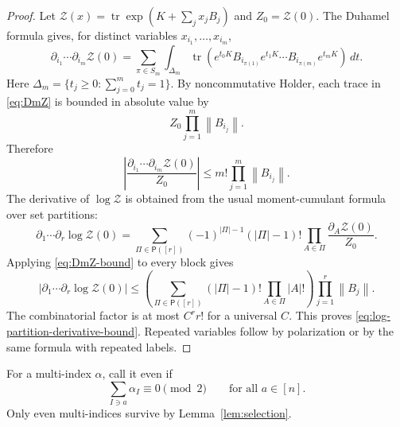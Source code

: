 \documentclass[11pt]{article}
\newcommand{\tr}{\operatorname{tr}}
\newcommand{\dd}{\,d}
\newcommand{\norm}[1]{\left\lVert #1\right\rVert}
\begin{document}
\begin{proof}
  Let $\mathcal Z(x)=\tr\exp(K+\sum_jx_jB_j)$ and $Z_0=\mathcal Z(0)$.  The
  Duhamel formula gives, for distinct variables $x_{i_1},\ldots,x_{i_m}$,
  \begin{equation}\label{eq:DmZ}
    \partial_{i_1}\cdots\partial_{i_m}\mathcal Z(0)
    =
    \sum_{\pi\in S_m}
    \int_{\Delta_m}
    \tr\left(
      e^{t_0K}B_{i_{\pi(1)}}e^{t_1K}\cdots
      B_{i_{\pi(m)}}e^{t_mK}
    \right)\dd t.
  \end{equation}
  Here $\Delta_m=\{t_j\geq0:\sum_{j=0}^m t_j=1\}$.  By noncommutative Holder,
  each trace in \eqref{eq:DmZ} is bounded in absolute value by
  \begin{equation}\label{eq:holder-bound-DmZ}
    Z_0\prod_{j=1}^m\norm{B_{i_j}}.
  \end{equation}
  Therefore
  \begin{equation}\label{eq:DmZ-bound}
    \left|
      \frac{\partial_{i_1}\cdots\partial_{i_m}\mathcal Z(0)}{Z_0}
    \right|
    \leq
    m!\prod_{j=1}^m\norm{B_{i_j}}.
  \end{equation}
  The derivative of $\log\mathcal Z$ is obtained from the usual moment-cumulant
  formula over set partitions:
  \begin{equation}\label{eq:partition-log-derivative}
    \partial_1\cdots\partial_r\log\mathcal Z(0)
    =
    \sum_{\Pi\in\mathsf P([r])}
    (-1)^{|\Pi|-1}(|\Pi|-1)!
    \prod_{A\in\Pi}
    \frac{\partial_A\mathcal Z(0)}{Z_0}.
  \end{equation}
  Applying \eqref{eq:DmZ-bound} to every block gives
  \begin{equation}\label{eq:partition-bound}
    \left|
      \partial_1\cdots\partial_r\log\mathcal Z(0)
    \right|
    \leq
    \left(
      \sum_{\Pi\in\mathsf P([r])}(|\Pi|-1)!\prod_{A\in\Pi}|A|!
    \right)
    \prod_{j=1}^r\norm{B_j}.
  \end{equation}
  The combinatorial factor is at most $C^rr!$ for a universal $C$.  This proves
  \eqref{eq:log-partition-derivative-bound}.  Repeated variables follow by
  polarization or by the same formula with repeated labels.
\end{proof}

For a multi-index $\alpha$, call it even if
\begin{equation}\label{eq:alpha-even-def}
  \sum_{I\ni a}\alpha_I\equiv0\pmod2
  \qquad\text{for all }a\in[n].
\end{equation}
Only even multi-indices survive by Lemma~\ref{lem:selection}.
\end{document}
